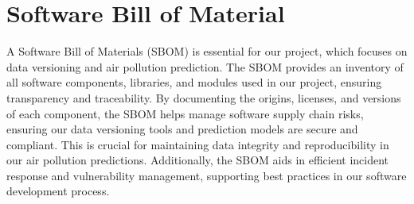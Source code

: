 %
%
%
\chapter{Software Bill of Material}
A Software Bill of Materials (SBOM) is essential for our project, which focuses on data versioning and air pollution prediction. The SBOM provides an inventory of all software components, libraries, and modules used in our project, ensuring transparency and traceability. By documenting the origins, licenses, and versions of each component, the SBOM helps manage software supply chain risks, ensuring our data versioning tools and prediction models are secure and compliant. This is crucial for maintaining data integrity and reproducibility in our air pollution predictions. Additionally, the SBOM aids in efficient incident response and vulnerability management, supporting best practices in our software development process.

